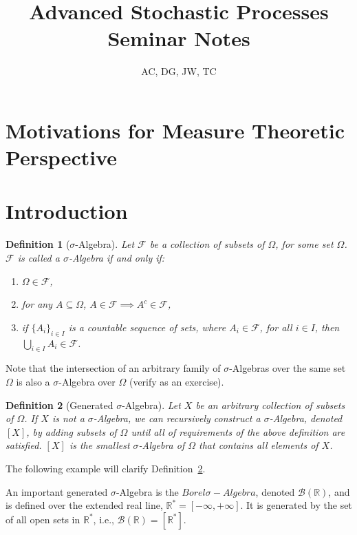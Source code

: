\documentclass[10pt, oneside]{article}
\title{Advanced Stochastic Processes Seminar Notes}
\author{AC, DG, JW, TC}
\newcommand{\R}{\mathbb{R}}
\newtheorem{defn}{Definition}
\begin{document}
\maketitle
\tableofcontents

\vspace{.25in}

\section{Motivations for Measure Theoretic Perspective}

\section{Introduction}
\begin{defn}[$\sigma$-Algebra]
    \label{defn:SA}
    Let $\mathcal{F}$ be a collection of subsets of $\Omega$, for some set $\Omega$.
    $\mathcal{F}$ is called a $\sigma$-Algebra if and only if:
    \begin{enumerate}
        \item $\Omega \in \mathcal{F}$, 
        \item for any $A \subseteq \Omega$, $A \in \mathcal{F} \implies 
            A^{c} \in \mathcal{F}$, 
        \item if $\{A_{i}\}_{i \in I}$ is a countable sequence of sets, where $A_i 
            \in \mathcal{F}$, for all $i \in I$, then $\bigcup_{i \in I}A_{i} \in 
            \mathcal{F}$.  
    \end{enumerate} 
\end{defn} 

Note that the intersection of an arbitrary family of $\sigma$-Algebras over the 
same set $\Omega$ is also a $\sigma$-Algebra over $\Omega$ (verify as an exercise). 

\begin{defn}[Generated $\sigma$-Algebra]
    \label{defn:gen-SA}
    Let $X$ be an arbitrary collection of subsets of $\Omega$. If $X$ is not a 
    $\sigma$-Algebra, we can recursively construct a $\sigma$-Algebra, denoted $[X]$,
    by adding subsets of $\Omega$ until all of requirements of the above definition
    are satisfied. $[X]$ is the smallest $\sigma$-Algebra of $\Omega$ that contains
    all elements of $X$. 
\end{defn}

The following example will clarify Definition~\ref{defn:gen-SA}.

An important generated $\sigma$-Algebra is the $Borel \sigma-Algebra$, denoted 
$\mathcal{B}(\R)$, and is defined over the extended real line, $\R^{*} = [-\infty,
+\infty]$. It is generated by the set of all open sets in $\R^{*}$, i.e., 
$\mathcal{B}(\R) = [\R^{*}]$. 
\end{document}
